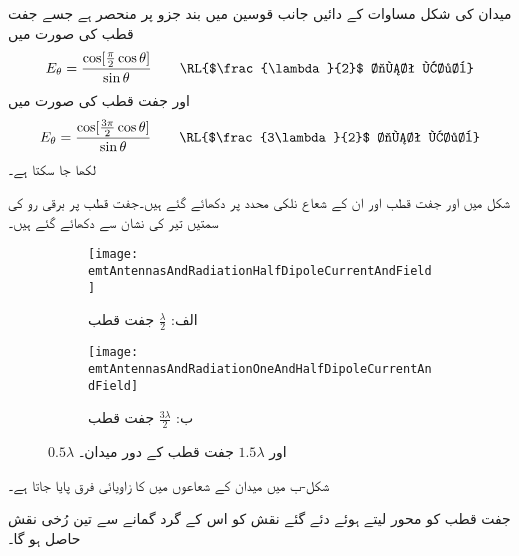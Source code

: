 میدان کی شکل مساوات  کے دائیں جانب قوسین میں بند جزو پر منحصر ہے جسے  جفت قطب کی صورت میں
\begin{align}\label{مساوات_اینٹینا_نصف_طول_موج_اینٹینا}
E_{\theta} =\frac{\cos [\frac{\pi}{2} \cos \theta]}{\sin \theta} \quad \quad \text{\RL{$\frac{\lambda}{2}$ جفت قطب}}
\end{align}
اور  جفت قطب کی صورت میں
\begin{align}
E_{\theta} =\frac{\cos [\frac{3\pi}{2} \cos \theta]}{\sin \theta} \quad \quad \text{\RL{$\frac{3\lambda}{2}$ جفت قطب}}
\end{align}
لکھا جا سکتا ہے۔

شکل  میں  اور  جفت قطب اور ان کے شعاع نلکی محدد پر دکھائے گئے ہیں۔جفت قطب پر برقی رو کی سمتیں تیر کی نشان سے دکھائے گئے ہیں۔

\begin{figure}
\centering
\begin{subfigure}{0.4\textwidth}
\centering
\texttt{[image: emtAntennasAndRadiationHalfDipoleCurrentAndField]}
\caption*{الف: $\frac{\lambda}{2}$ جفت قطب}
\end{subfigure}%
%
\begin{subfigure}{0.4\textwidth}
\centering
\texttt{[image: emtAntennasAndRadiationOneAndHalfDipoleCurrentAndField]}
\caption*{ب: $\frac{3\lambda}{2}$ جفت قطب}
\end{subfigure}%
\caption{$0.5\lambda$ اور $1.5\lambda$ جفت قطب کے دور میدان۔}
\label{شکل_اینٹینا_نصف_جفت_قطب_برقی_رو}
\end{figure}%

شکل-ب میں میدان کے شعاعوں میں  کا زاویائی فرق پایا جاتا ہے۔

جفت قطب کو محور لیتے ہوئے دئے گئے نقش کو اس کے گرد گمانے سے تین رُخی نقش حاصل ہو گا۔ 


